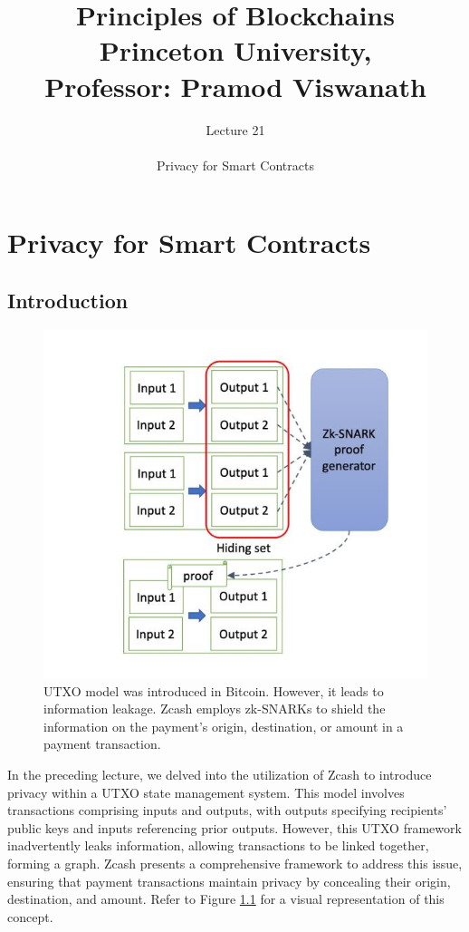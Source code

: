 \documentclass{report}
\title{\Huge{Principles of Blockchains \\ Princeton University,\\
		Professor: Pramod Viswanath}}
\author{\huge{Lecture 21} \\\\ Privacy for Smart Contracts}
\begin{document}
\maketitle
\newpage%
\tableofcontents
\pagebreak

\chapter{Privacy for Smart Contracts}
\section{Introduction}
\begin{center}
	\begin{figure}
		\centering
		\includegraphics[width=0.8\linewidth]{Fig/F1}
		\caption{UTXO model was introduced in Bitcoin. However, it leads to information leakage. Zcash employs zk-SNARKs to shield the information on the payment’s origin, destination, or amount in a payment transaction.}
		\label{fig:f1}
	\end{figure}
\end{center}
In the preceding lecture, we delved into the utilization of Zcash to introduce privacy within a UTXO state management system. This model involves transactions comprising inputs and outputs, with outputs specifying recipients' public keys and inputs referencing prior outputs. However, this UTXO framework inadvertently leaks information, allowing transactions to be linked together, forming a graph. Zcash presents a comprehensive framework to address this issue, ensuring that payment transactions maintain privacy by concealing their origin, destination, and amount. Refer to Figure \ref{fig:f1} for a visual representation of this concept.\\
\end{document}
